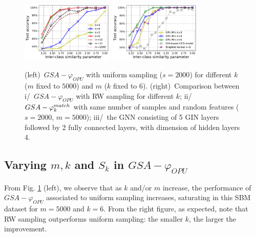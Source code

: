 \documentclass{article}
\newcommand\nt[1]{\textcolor{blue}{#1}}
\begin{document}
\begin{figure}
\centering
	\includegraphics[width=4.4cm]{figs/LightOn_adj_SBM_Similarity_graphlet_size.pdf}%
%
		\includegraphics[width=4.4cm]{figs/LightOn_adj_SBM_similarity_graphlet_size_RW.pdf}%
	\caption{(left)~$GSA-\varphi_{OPU}$ with uniform sampling ($s=2000$) for different $k$ ($m$ fixed to $5000$) and $m$ ($k$ fixed to $6$). (right)~Comparison between i/~$GSA-\varphi_{OPU}$ with RW sampling for different $k$; ii/~$GSA-\varphi^{match}_k$ with same number of samples and random features ($s=2000$, $m=5000$); iii/~the GNN consisting of 5 GIN layers \cite{GCN_powerful} followed by 2 fully connected layers, with dimension of hidden layers 4.
}
	\label{fig:GCN}
\end{figure}



\subsection{Varying $m, k$ and $S_k$ in $GSA-{\varphi_{OPU}}$}
From Fig. \ref{fig:GCN} (left), we observe that as $k$ and/or $m$ increase, the performance of $GSA-{\varphi_{OPU}}$ associated to uniform sampling increases, saturating in this SBM dataset for $m=5000$ and $k=6$. From the right figure, as expected, note that RW sampling outperforms uniform sampling: the smaller $k$, the larger the improvement.
\end{document}
